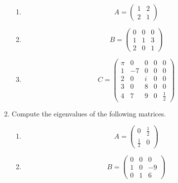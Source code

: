 \begin{enumerate}
\begin{enumerate}
	\item 
	$$
	A = \begin{pmatrix}
	1&2\\
	2&1
	\end{pmatrix}
	$$
	\item
	$$
	B = \begin{pmatrix}
	0&0&0\\
	1&1&3\\
	2&0&1
	\end{pmatrix}
	$$
	\item 
	$$C=
	\begin{pmatrix}
	\pi& 0& 0& 0 &0\\
	1 & -7&  0& 0 &0\\
	2 & 0& i  & 0 &0\\
	3 & 0& 8  & 0 & 0\\
	4 & 7& 9& 0& \frac{1}{2}
	\end{pmatrix}
	$$
\end{enumerate}
\item Compute the eigenvalues of the following matrices.
\begin{enumerate}
	\item $$ A= 
	\begin{pmatrix}
	0&\frac{1}{2}\\
	\frac{1}{2}&0
	\end{pmatrix}
	$$
	\item
	$$ B=
	\begin{pmatrix}
	0&0&0\\
	1&0&-9\\
	0&1&6
	\end{pmatrix}
	$$
\end{enumerate}


\end{enumerate}
